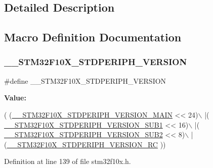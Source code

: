 \subsection{Detailed Description}


\subsection{Macro Definition Documentation}
\mbox{\label{group___library__configuration__section_gafb19c8675ea01accc2f8e5f467827328}} 
\subsubsection{\texorpdfstring{\+\_\+\+\_\+\+S\+T\+M32\+F10\+X\+\_\+\+S\+T\+D\+P\+E\+R\+I\+P\+H\+\_\+\+V\+E\+R\+S\+I\+ON}{\_\_STM32F10X\_STDPERIPH\_VERSION}}
{\footnotesize\ttfamily \#define \+\_\+\+\_\+\+S\+T\+M32\+F10\+X\+\_\+\+S\+T\+D\+P\+E\+R\+I\+P\+H\+\_\+\+V\+E\+R\+S\+I\+ON}

{\bfseries Value\+:}
\begin{DoxyCode}
( (\hyperlink{group___library__configuration__section_ga4c236abf68876febcb304f05ed3bafac}{\_\_STM32F10X\_STDPERIPH\_VERSION\_MAIN} << 24)\(\backslash\)
                                             |(
      \hyperlink{group___library__configuration__section_ga7ce69a7c755b9d0551e9755d28612cb0}{\_\_STM32F10X\_STDPERIPH\_VERSION\_SUB1} << 16)\(\backslash\)
                                             |(
      \hyperlink{group___library__configuration__section_ga3ec41777ab08436b801c9c295248a6c7}{\_\_STM32F10X\_STDPERIPH\_VERSION\_SUB2} << 8)\(\backslash\)
                                             |(\hyperlink{group___library__configuration__section_gae0abedef178fde6294fdfd3401ef6e2c}{\_\_STM32F10X\_STDPERIPH\_VERSION\_RC}
      ))
\end{DoxyCode}


Definition at line 139 of file stm32f10x.\+h.

